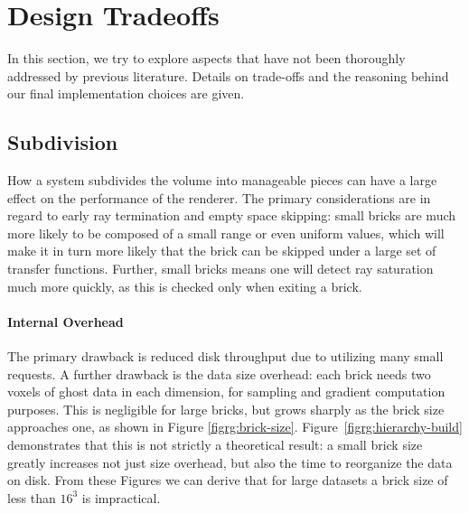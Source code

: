 \section{Design Tradeoffs}
\label{sec:tradeoffs}

In this section, we try to explore aspects that have not been
thoroughly addressed by previous literature.  Details on trade-offs and
the reasoning behind our final implementation choices are given.


\subsection{Subdivision}
\label{sec:subdivision}

How a system subdivides the volume into manageable pieces can have
a large effect on the performance of the renderer.  The primary
considerations are in regard to early ray termination and empty space
skipping: small bricks are much more likely to be composed of a small
range or even uniform values, which will make it in turn more likely
that the brick can be skipped under a large set of transfer functions.
Further, small bricks means one will detect ray saturation much more
quickly, as this is checked only when exiting a brick.

\paragraph{Internal Overhead}

The primary drawback is reduced disk throughput due to utilizing many
small requests.  A further drawback is the data size overhead: each
brick needs two voxels of ghost data in each dimension, for sampling
and gradient computation purposes.  This is negligible for large
bricks, but grows sharply as the brick size approaches one, as shown in
Figure
\ref{figrg:brick-size}. Figure~\ref{figrg:hierarchy-build} demonstrates
that this is not strictly a theoretical result: a small brick size
greatly increases not just size overhead, but also the time to
reorganize the data on disk.  From these Figures we can derive that for
large datasets a brick size of less than $16^3$ is impractical.


